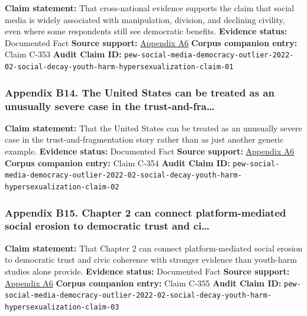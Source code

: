 \documentclass[
  american,
  11pt,
  letterpaper,
]{article}
\begin{document}
\textbf{Claim statement:} That cross-national evidence supports the
claim that social media is widely associated with manipulation,
division, and declining civility, even where some respondents still see
democratic benefits. \textbf{Evidence status:} Documented Fact
\textbf{Source support:}
\hyperref[appendix-a6-social-media-seen-as-mostly-good-for-democracy-across-many-nations-but-u-s-is-a-major-outlier]{Appendix
A6} \textbf{Corpus companion entry:} Claim C-353 \textbf{Audit Claim
ID:}
\texttt{pew-social-media-democracy-outlier-2022-02-social-decay-youth-harm-hypersexualization-claim-01}

\subsubsection{Appendix B14. The United States can be treated as an
unusually severe case in the
trust-and-fra\ldots{}}\label{appendix-b14-the-united-states-can-be-treated-as-an-unusually-severe-case-in-the-trust-and-fra}

\textbf{Claim statement:} That the United States can be treated as an
unusually severe case in the trust-and-fragmentation story rather than
as just another generic example. \textbf{Evidence status:} Documented
Fact \textbf{Source support:}
\hyperref[appendix-a6-social-media-seen-as-mostly-good-for-democracy-across-many-nations-but-u-s-is-a-major-outlier]{Appendix
A6} \textbf{Corpus companion entry:} Claim C-354 \textbf{Audit Claim
ID:}
\texttt{pew-social-media-democracy-outlier-2022-02-social-decay-youth-harm-hypersexualization-claim-02}

\subsubsection{Appendix B15. Chapter 2 can connect platform-mediated
social erosion to democratic trust and
ci\ldots{}}\label{appendix-b15-chapter-2-can-connect-platform-mediated-social-erosion-to-democratic-trust-and-ci}

\textbf{Claim statement:} That Chapter 2 can connect platform-mediated
social erosion to democratic trust and civic coherence with stronger
evidence than youth-harm studies alone provide. \textbf{Evidence
status:} Documented Fact \textbf{Source support:}
\hyperref[appendix-a6-social-media-seen-as-mostly-good-for-democracy-across-many-nations-but-u-s-is-a-major-outlier]{Appendix
A6} \textbf{Corpus companion entry:} Claim C-355 \textbf{Audit Claim
ID:}
\texttt{pew-social-media-democracy-outlier-2022-02-social-decay-youth-harm-hypersexualization-claim-03}
\end{document}
